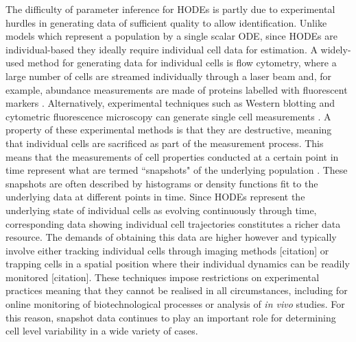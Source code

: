 \documentclass[10pt,letterpaper]{article}
\begin{document}
The difficulty of parameter inference for HODEs is partly due to experimental hurdles in generating data of sufficient quality to allow identification. Unlike models which represent a population by a single scalar ODE, since HODEs are individual-based they ideally require individual cell data for estimation. A widely-used method for generating data for individual cells is flow cytometry, where a large number of cells are streamed individually through a laser beam and, for example, abundance measurements are made of proteins labelled with fluorescent markers \cite{telford2012flow}. Alternatively, experimental techniques such as Western blotting and cytometric fluorescence microscopy can generate single cell measurements \cite{hughes2014single,hasenauer2011identification}. A property of these experimental methods is that they are destructive, meaning that individual cells are sacrificed as part of the measurement process. This means that the measurements of cell properties conducted at a certain point in time represent what are termed ``snapshots" of the underlying population \cite{hasenauer2011identification}. These snapshots are often described by histograms \cite{dixit2018maximum} or density functions \cite{waldherr2018estimation} fit to the underlying data at different points in time. Since HODEs represent the underlying state of individual cells as evolving continuously through time, corresponding data showing individual cell trajectories constitutes a richer data resource. The demands of obtaining this data are higher however and typically involve either tracking individual cells through imaging methods [citation] or trapping cells in a spatial position where their individual dynamics can be readily monitored [citation]. These techniques impose restrictions on experimental practices meaning that they cannot be realised in all circumstances, including for online monitoring of biotechnological processes or analysis of \textit{in vivo} studies. For this reason, snapshot data continues to play an important role for determining cell level variability in a wide variety of cases.
\end{document}
